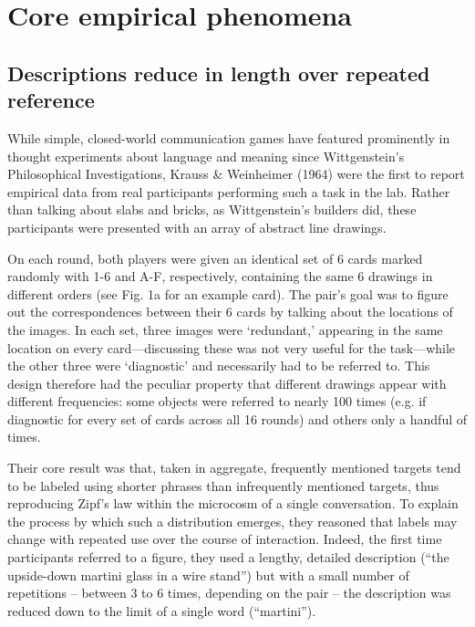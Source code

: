 \documentclass[11pt, floatsintext, man]{apa6}
\begin{document}
\section{Core empirical phenomena}

\subsection{Descriptions reduce in length over repeated reference}

While simple, closed-world communication games have featured prominently in thought experiments about language and meaning since Wittgenstein's Philosophical Investigations, Krauss \& Weinheimer (1964) were the first to report empirical data from real participants performing such a task in the lab. Rather than talking about slabs and bricks, as Wittgenstein's builders did, these participants were presented with an array of abstract line drawings. %

On each round, both players were given an identical set of 6 cards marked randomly with 1-6 and A-F, respectively, containing the same 6 drawings in different orders (see Fig. 1a for an example card). The pair's goal was to figure out the correspondences between their 6 cards by talking about the locations of the images. In each set, three images were `redundant,' appearing in the same location on every card---discussing these was not very useful for the task---while the other three were `diagnostic' and necessarily had to be referred to. This design therefore had the peculiar property that different drawings appear with different frequencies: some objects were referred to nearly 100 times (e.g. if diagnostic for every set of cards across all 16 rounds) and others only a handful of times. 

Their core result was that, taken in aggregate, frequently mentioned targets tend to be labeled using shorter phrases than infrequently mentioned targets, thus reproducing Zipf's law within the microcosm of a single conversation. To explain the process by which such a distribution emerges, they reasoned that labels may change with repeated use over the course of interaction. Indeed, the first time participants referred to a figure, they used a lengthy, detailed description (``the upside-down martini glass in a wire stand'') but with a small number of repetitions -- between 3 to 6 times, depending on the pair -- the description was reduced down to the limit of a single word (``martini''). 
\end{document}
